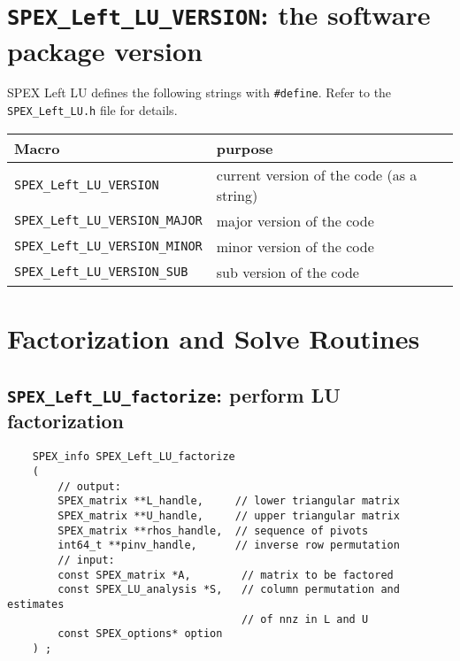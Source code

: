 \documentclass[12pt]{report}
\theoremstyle{definition}
\begin{document}
\cprotect\section{\verb|SPEX_Left_LU_VERSION|: the software package version}

SPEX Left LU defines the following strings with \verb|#define|. Refer to
the \verb|SPEX_Left_LU.h| file for details.

\begin{center}
\begin{tabular}{ll}
\hline
Macro & purpose \\
\hline
\verb|SPEX_Left_LU_VERSION|       & current version of the code (as a string)\\
\verb|SPEX_Left_LU_VERSION_MAJOR| & major version of the code\\
\verb|SPEX_Left_LU_VERSION_MINOR| & minor version of the code   \\
\verb|SPEX_Left_LU_VERSION_SUB|   & sub version of the code\\
\hline
\end{tabular}
\end{center}

\section{Factorization and Solve Routines}

\cprotect\subsection{\verb|SPEX_Left_LU_factorize|: perform LU factorization}
\label{s:LeftLU:SPEX_Left_LU_factorize}

\begin{mdframed}[userdefinedwidth=6in]
{\footnotesize
\begin{verbatim}
    SPEX_info SPEX_Left_LU_factorize
    (
        // output:
        SPEX_matrix **L_handle,     // lower triangular matrix
        SPEX_matrix **U_handle,     // upper triangular matrix
        SPEX_matrix **rhos_handle,  // sequence of pivots
        int64_t **pinv_handle,      // inverse row permutation
        // input:
        const SPEX_matrix *A,        // matrix to be factored
        const SPEX_LU_analysis *S,   // column permutation and estimates
                                     // of nnz in L and U 
        const SPEX_options* option
    ) ;
\end{verbatim}
} \end{mdframed}
\end{document}
